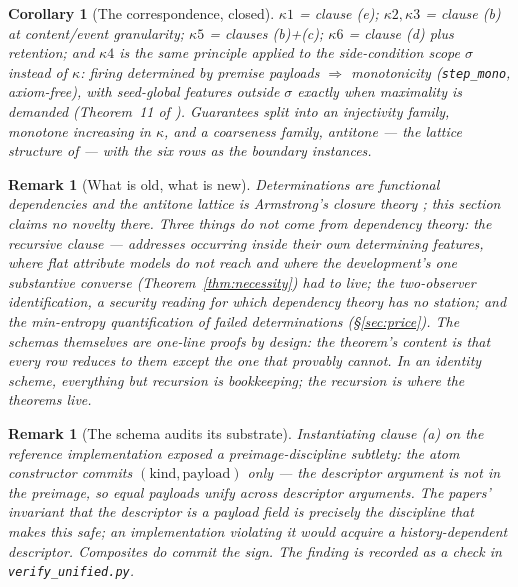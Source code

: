 \documentclass[10pt]{article}
\newtheorem{corollary}[theorem]{Corollary}
\newtheorem{remark}[theorem]{Remark}
\begin{document}
\begin{corollary}[The correspondence, closed]\label{cor:closed}
$\kappa1$ = clause (e); $\kappa2, \kappa3$ = clause (b) at content/event granularity; $\kappa5$ = clauses (b)+(c); $\kappa6$ = clause (d) plus retention; and $\kappa4$ is the same principle applied to the \emph{side-condition} scope $\sigma$ instead of $\kappa$: firing determined by premise payloads $\Rightarrow$ monotonicity (\texttt{step\_mono}, axiom-free), with seed-global features outside $\sigma$ exactly when maximality is demanded (Theorem~11 of \cite{growth}). Guarantees split into an injectivity family, monotone increasing in $\kappa$, and a coarseness family, antitone --- the lattice structure of \cite{Armstrong74} --- with the six rows as the boundary instances.
\end{corollary}

\begin{remark}[What is old, what is new]\label{rem:armstrong}
Determinations are functional dependencies and the antitone lattice is Armstrong's closure theory \cite{Armstrong74}; this section claims no novelty there. Three things do not come from dependency theory: the \emph{recursive clause} --- addresses occurring inside their own determining features, where flat attribute models do not reach and where the development's one substantive converse (Theorem~\ref{thm:necessity}) had to live; the \emph{two-observer identification}, a security reading for which dependency theory has no station; and the \emph{min-entropy quantification} of failed determinations (\S\ref{sec:price}). The schemas themselves are one-line proofs by design: the theorem's content is that every row reduces to them \emph{except} the one that provably cannot. In an identity scheme, everything but recursion is bookkeeping; the recursion is where the theorems live.
\end{remark}

\begin{remark}[The schema audits its substrate]\label{rem:audit}
Instantiating clause (a) on the reference implementation exposed a preimage-discipline subtlety: the atom constructor commits $(\text{kind}, \text{payload})$ only --- the descriptor argument is \emph{not} in the preimage, so equal payloads unify across descriptor arguments. The papers' invariant that the descriptor is a payload \emph{field} is precisely the discipline that makes this safe; an implementation violating it would acquire a history-dependent descriptor. Composites do commit the sign. The finding is recorded as a check in \texttt{verify\_unified.py}.
\end{remark}
\end{document}
